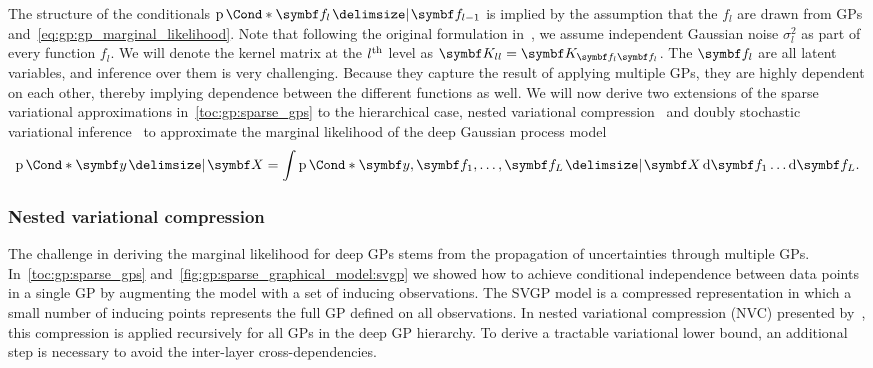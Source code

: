 The structure of the conditionals $\Prob*{\mat{f}_l \given \mat{f}_{l-1}}$ is implied by the assumption that the $f_l$ are drawn from GPs and~\cref{eq:gp:gp_marginal_likelihood}.
Note that following the original formulation in~\parencite{damianou_deep_2013}, we assume independent Gaussian noise $\sigma^2_l$ as part of every function $f_l$.
We will denote the kernel matrix at the $l^{\text{th}}$ level as $\mat{K}_{ll} = \mat{K}_{\mat{f}_l\mat{f}_l}$.
The $\mat{f}_l$ are all latent variables, and inference over them is very challenging.
Because they capture the result of applying multiple GPs, they are highly dependent on each other, thereby implying dependence between the different functions as well.
We will now derive two extensions of the sparse variational approximations in~\cref{toc:gp:sparse_gps} to the hierarchical case, nested variational compression~\parencite{hensman_nested_2014} and doubly stochastic variational inference~\parencite{salimbeni_doubly_2017} to approximate the marginal likelihood of the deep Gaussian process model
\begin{equation}
    \begin{split}
        \label{eq:dgp:marginal_likelihood}
        \Prob*{\mat{y} \given \mat{X}} = \int \Prob*{\mat{y}, \mat{f}_1, \dots, \mat{f}_L \given \mat{X}} \diff \mat{f}_1 \dots \diff \mat{f}_L.
    \end{split}
\end{equation}


\subsubsection{Nested variational compression}
The challenge in deriving the marginal likelihood for deep GPs stems from the propagation of uncertainties through multiple GPs.
In~\cref{toc:gp:sparse_gps} and~\cref{fig:gp:sparse_graphical_model:svgp} we showed how to achieve conditional independence between data points in a single GP by augmenting the model with a set of inducing observations.
The SVGP model is a compressed representation in which a small number of inducing points represents the full GP defined on all observations.
In nested variational compression (NVC) presented by~\textcite{hensman_nested_2014}, this compression is applied recursively for all GPs in the deep GP hierarchy.
To derive a tractable variational lower bound, an additional step is necessary to avoid the inter-layer cross-dependencies.

